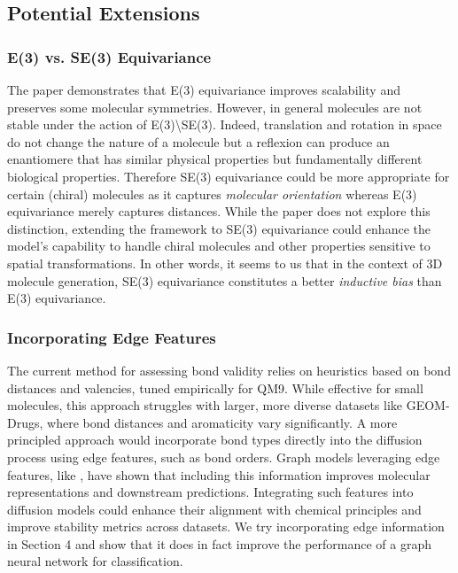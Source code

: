 \documentclass[sigconf]{acmart}
\begin{document}
\subsection{Potential Extensions}
\subsubsection{E(3) vs. SE(3) Equivariance}
The paper demonstrates that E(3) equivariance improves scalability and preserves some molecular symmetries. However, in general molecules are not stable under the action of E(3)\textbackslash SE(3). Indeed, translation and rotation in space do not change the nature of a molecule but a reflexion can produce an enantiomere that has similar physical properties but fundamentally different biological properties. Therefore SE(3) equivariance could be more appropriate for certain (chiral) molecules as it captures \textit{molecular orientation} whereas E(3) equivariance merely captures distances. While the paper does not explore this distinction, extending the framework to SE(3) equivariance could enhance the model’s capability to handle chiral molecules and other properties sensitive to spatial transformations. In other words, it seems to us that in the context of 3D molecule generation, SE(3) equivariance constitutes a better \textit{inductive bias} than E(3) equivariance.

\subsubsection{Incorporating Edge Features}
The current method for assessing bond validity relies on heuristics based on bond distances and valencies, tuned empirically for QM9. While effective for small molecules, this approach struggles with larger, more diverse datasets like GEOM-Drugs, where bond distances and aromaticity vary significantly. A more principled approach would incorporate bond types directly into the diffusion process using edge features, such as bond orders. Graph models leveraging edge features, like \cite{gilmer2017neuralmessagepassingquantum}, have shown that including this information improves molecular representations and downstream predictions. Integrating such features into diffusion models could enhance their alignment with chemical principles and improve stability metrics across datasets. We try incorporating edge information in Section 4 and show that it does in fact improve the performance of a graph neural network for classification.
\end{document}
